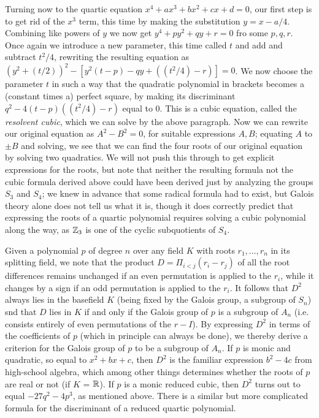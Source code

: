 Turning now to the quartic equation $x^4 + ax^3 + bx^2 + cx + d = 0$, our first step is to get rid of the $x^3$ term, this time by making the substitution $y = x - a/4$.  Combining like powers of $y$ we now get $y^4 + py^2 + qy + r = 0$ fro some $p,q,r$.  Once again we introduce a new parameter, this time called $t$ and add and subtract $t^2/4$, rewriting the resulting equation as
$(y^2 + (t/2))^2 - [y^2(t-p) - qy + ((t^2/4) - r)] = 0$.  We now choose the parameter $t$ in such a way that the quadratic polynomial in brackets becomes a (constant times a) perfect square, by making its discriminant $q^2 - 4(t-p)((t^2/4) - r)$ equal to 0.  This is a cubic equation, called the {\sl resolvent cubic}, which we can solve by the above paragraph.  Now we can rewrite our original equation as
$A^2 - B^2 = 0$, for suitable expressions $A,B$; equating $A$ to $\pm B$ and solving, we see that we can find the four roots of our original equation by solving two quadratics.  We will not push this through to get explicit expressions for the roots, but note that neither the resulting formula not the cubic formula derived above could have been derived just by analyzing the groups $S_3$ and $S_4$; we knew in advance that some radical formula had to exist, but Galois theory alone does not tell us what it is, though it does correctly predict that expressing the roots of a quartic polynomial requires solving a cubic polynomial along the way, as $\Bbb Z_3$ is one of the cyclic subquotients of $S_4$.  

Given a polynomial $p$ of degree $n$ over any field $K$ with roots $r_1,\ldots,r_n$ in its splitting field, we note that the product $D=\Pi_{i<j} (r_i - r_j)$ of all the root differences remains unchanged if an even permutation is applied to the $r_i$, while it changes by a sign if an odd permutation is applied to the $r_i$.  It follows that $D^2$ always lies in the basefield $K$ (being fixed by the Galois group, a subgroup of $S_n$) snd that $D$ lies in $K$ if and only if the Galois group of $p$ is a subgroup of $A_n$ (i.e. consists entirely of even permutations of the $r-I$).  By expressing $D^2$ in terms of the coefficients of $p$ (which in principle can always be done), we thereby derive a criterion for the Galois group of $p$ to be a subgroup of $A_n$.  If $p$ is monic and quadratic, so equal to $x^2 + bx + c$, then $D^2$ is the familiar expression $b^2 - 4c$ from high-school algebra, which among other things determines whether the roots of $p$ are real or not (if $K$ = $\Bbb R$).  If $p$ is a monic reduced cubic, then $D^2$ turns out to equal $-27q^2 - 4p^3$, as mentioned above.  There is a similar but more complicated formula for the discriminant of a reduced quartic polynomial.  

